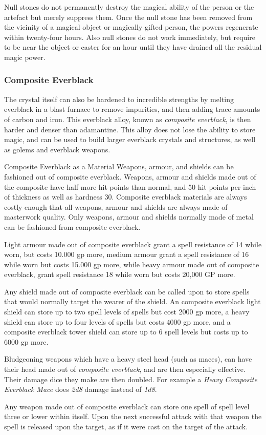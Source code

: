 Null stones do not permanently destroy the magical ability of the person or
the artefact but merely suppress them. Once the null stone has been removed
from the vicinity of a magical object or magically gifted person, the powers
regenerate within twenty-four hours. Also null stones do not work immediately,
but require to be near the object or caster for an hour until they have
drained all the residual magic power.

\subsubsection{Composite Everblack}
\label{sec:Composite Everblack}

The crystal itself can also be hardened to incredible strengths by melting
everblack in a blast furnace to remove impurities, and then adding trace
amounts of carbon and iron. This everblack alloy, known as \emph{composite
everblack}, is then harder and denser than adamantine. This alloy does not lose
the ability to store magic, and can be used to build larger everblack crystals
and structures, as well as golems and everblack weapons.

\begin{35e}{Composite Everblack as a Material}
  Weapons, armour, and shields can be fashioned out of composite everblack.
  Weapons, armour and shields made out of the composite have half more hit
  points than normal, and 50 hit points per inch of thickness as well as
  hardness 30. Composite everblack materials are always costly enough that all
  weapons, armour and shields are always made of masterwork quality.  Only
  weapons, armour and shields normally made of metal can be fashioned from
  composite everblack.

  Light armour made out of composite everblack grant a spell resistance of 14
  while worn, but costs 10.000 gp more, medium armour grant a spell resistance
  of 16 while worn but costs 15.000 gp more, while heavy armour made out of
  composite everblack, grant spell resistance 18 while worn but costs 20,000
  GP more.

  Any shield made out of composite everblack can be called upon to store
  spells that would normally target the wearer of the shield. An composite
  everblack light shield can store up to two spell levels of spells but cost
  2000 gp more, a heavy shield can store up to four levels of spells but costs
  4000 gp more, and a composite everblack tower shield can store up to 6 spell
  levels but costs up to 6000 gp more.

  Bludgeoning weapons which have a heavy steel head (such as maces), can have
  their head made out of \emph{composite everblack}, and are then especially
  effective. Their damage dice they make are then doubled. For example a
  \emph{Heavy Composite Everblack Mace} does \emph{2d8} damage instead of
  \emph{1d8}.

  Any weapon made out of composite everblack can store one spell of spell
  level three or lower within itself. Upon the next successful attack with
  that weapon the spell is released upon the target, as if it were cast on
  the target of the attack.
\end{35e}

